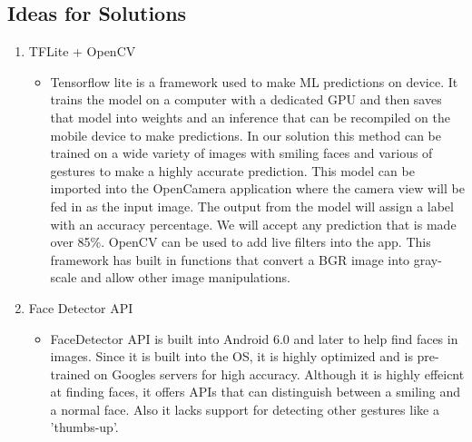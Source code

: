\documentclass[12pt, titlepage]{article}
\begin{document}
\subsection{Ideas for Solutions}
\begin{enumerate}
\item TFLite + OpenCV
\begin{itemize}
\item Tensorflow lite is a framework used to make ML predictions on device. It trains the model on a computer with a dedicated GPU and then saves that model into weights and an inference that can be recompiled on the mobile device to make predictions. In our solution this method can be trained on a wide variety of images with smiling faces and various of gestures to make a highly accurate prediction. This model can be imported into the OpenCamera application where the camera view will be fed in as the input image. The output from the model will assign a label with an accuracy percentage. We will accept any prediction that is made over 85\%. OpenCV can be used to add live filters into the app. This framework has built in functions that convert a BGR image into gray-scale and allow other image manipulations. 
\end{itemize}


\item Face Detector API
\begin{itemize}
\item FaceDetector API is built into Android 6.0 and later to help find faces in images. Since it is built into the OS, it is highly optimized and is pre-trained on Googles servers for high accuracy. Although it is highly effeicnt at finding faces, it offers APIs that can distinguish between a smiling and a normal face. Also it lacks support for detecting other gestures like a 'thumbs-up'.
\end{itemize}

\end{enumerate}
\end{document}
